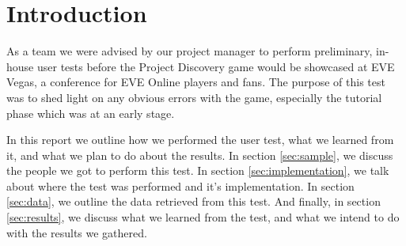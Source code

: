 \section{Introduction}\label{sec:introduction}
As a team we were advised by our project manager to perform preliminary, in-house user tests before the Project Discovery game would be showcased at EVE Vegas, a conference for EVE Online players and fans. The purpose of this test was to shed light on any obvious errors with the game, especially the tutorial phase which was at an early stage.

In this report we outline how we performed the user test, what we learned from it, and what we plan to do about the results. In section \ref{sec:sample}, we discuss the people we got to perform this test. In section \ref{sec:implementation}, we talk about where the test was performed and it's implementation. In section \ref{sec:data}, we outline the data retrieved from this test. And finally, in section \ref{sec:results}, we discuss what we learned from the test, and what we intend to do with the results we gathered.